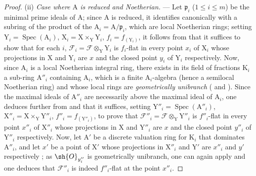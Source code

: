 \begin{proof}
(ii) \emph{Case where $\mathrm{A}$ is reduced and Noetherian.} --- Let $\mathfrak{p}_i$ ($1\leq i\leq m$) be the minimal prime ideals of $\mathrm{A}$; since $\mathrm{A}$ is reduced, it identifies canonically with a subring of the product of the $\mathrm{A}_i=\mathrm{A}/\mathfrak{p}_i$, which are local Noetherian rings; setting $\mathrm{Y}_i=\operatorname{Spec}(\mathrm{A}_i)$, $\mathrm{X}_i=\mathrm{X}\times_\mathrm{Y}\mathrm{Y}_i$, $f_i=f_{(\mathrm{Y}_i)}$, it follows from  that it suffices to show that for each $i$, $\mathscr{F}_i=\mathscr{F}\otimes_\mathrm{Y}\mathrm{Y}_i$ is $f_i$-flat in every point $x_i$ of $\mathrm{X}_i$ whose projections in $\mathrm{X}$ and $\mathrm{Y}_i$ are $x$ and the closed point $y_i$ of $\mathrm{Y}_i$ respectively.
Now, since $\mathrm{A}_i$ is a local Noetherian integral ring, there exists in its field of fractions $\mathrm{K}_i$ a sub-ring $\mathrm{A}''_i$ containing $\mathrm{A}_i$, which is a finite $\mathrm{A}_i$-algebra (hence a semilocal Noetherian ring) and whose local rings are \emph{geometrically unibranch} ( and ).
Since the maximal ideals of $\mathrm{A}''_i$ are necessarily above the maximal ideal of $\mathrm{A}_i$, one deduces further from  and  that it suffices, setting $\mathrm{Y}''_i=\operatorname{Spec}(\mathrm{A}''_i)$, $\mathrm{X}''_i=\mathrm{X}\times_\mathrm{Y}\mathrm{Y}''_i$, $f''_i=f_{(\mathrm{Y}''_i)}$, to prove that $\mathscr{F}''_i=\mathscr{F}\otimes_\mathrm{Y}\mathrm{Y}''_i$ is $f''_i$-flat in every point $x''_i$ of $\mathrm{X}''_i$ whose projections in $\mathrm{X}$ and $\mathrm{Y}''_i$ are $x$ and the closed point $y''_i$ of $\mathrm{Y}''_i$ respectively.
Now, let $\mathrm{A}'$ be a discrete valuation ring for $\mathrm{K}_i$ that dominates $\mathrm{A}''_i$, and let $x'$ be a point of $\mathrm{X}'$ whose projections in $\mathrm{X}''_i$ and $\mathrm{Y}'$ are $x''_i$ and $y'$ respectively ; as $\sh{O}_{y''_i}$ is geometrically unibranch, one can again apply  and one deduces that $\mathscr{F}''_i$ is indeed $f''_i$-flat at the point $x''_i$.
\end{proof}

